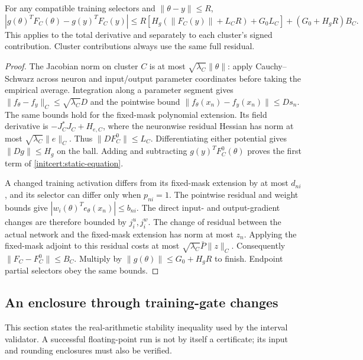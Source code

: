 \begin{proposition}\label{initcert:static-bound}
For any compatible training selectors and $\|\theta-y\|\le R$,
\begin{equation}\label{initcert:static-equation}
 \left|g(\theta)^TF_C(\theta)-g(y)^TF_C(y)\right|
 \le R\left[H_g(\|F_C(y)\|+L_CR)+G_0L_C\right]
                   +(G_0+H_gR)B_C.
\end{equation}
This applies to the total derivative and separately to each cluster's
signed contribution. Cluster contributions always use the same full residual.
\end{proposition}
\begin{proof}
The Jacobian norm on cluster $C$ is at most
$\sqrt{\lambda_C}\|\theta\|$: apply Cauchy--Schwarz across neuron and
input/output parameter coordinates before taking the empirical average.
Integration along a parameter segment gives
$\|f_\theta-f_y\|_C\le\sqrt{\lambda_C}D$ and the pointwise bound
$\|f_\theta(x_n)-f_y(x_n)\|\le Ds_n$.
The same bounds hold for the fixed-mask polynomial extension.
Its field derivative is $-J_C^*J_C+H_{e,C}$, where the neuronwise
residual Hessian has norm at most
$\sqrt{\lambda_C}\|e\|_C$. Thus
$\|DF_C^0\|\le L_C$. Differentiating either potential gives
$\|Dg\|\le H_g$ on the ball. Adding and subtracting
$g(y)^TF_C^0(\theta)$ proves the first term of \eqref{initcert:static-equation}.

A changed training activation differs from its fixed-mask extension by at
most $d_{ni}$, and its selector can differ only when $p_{ni}=1$.
The pointwise residual and weight bounds give
$|w_i(\theta)^Te_\theta(x_n)|\le b_{ni}$. The direct input- and
output-gradient changes are therefore bounded by $j_i^u,j_i^w$.
The change of residual between the actual network and the fixed-mask
extension has norm at most $z_n$. Applying the fixed-mask adjoint to
this residual costs at most $\sqrt{\lambda_C}\bar P\|z\|_C$.
Consequently $\|F_C-F_C^0\|\le B_C$. Multiply by
$\|g(\theta)\|\le G_0+H_gR$ to finish. Endpoint partial selectors obey
the same bounds.
\end{proof}


\subsection{An enclosure through training-gate changes}
This section states the real-arithmetic stability inequality used by the
interval validator. A successful floating-point run is not by
itself a certificate; its input and rounding enclosures must also be verified.

